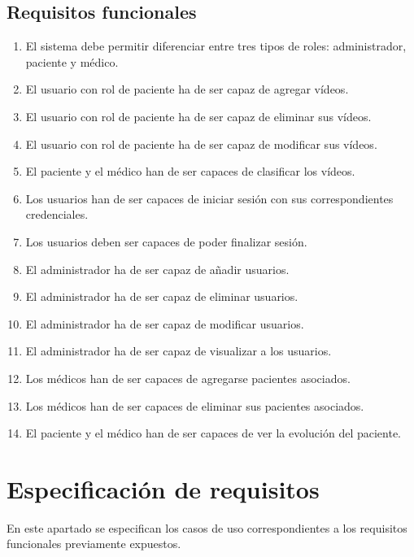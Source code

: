 \subsection{Requisitos funcionales}
\begin{enumerate}[label=\textbf{RF\arabic*:}]

\item El sistema debe permitir diferenciar entre tres tipos de roles: administrador, paciente y médico.
\item El usuario con rol de paciente ha de ser capaz de agregar vídeos.
\item El usuario con rol de paciente ha de ser capaz de eliminar sus vídeos.
\item El usuario con rol de paciente ha de ser capaz de modificar sus vídeos.
\item El paciente y el médico han de ser capaces de clasificar los vídeos.
\item Los usuarios han de ser capaces de iniciar sesión con sus correspondientes credenciales.
\item Los usuarios deben ser capaces de poder finalizar sesión.
\item El administrador ha de ser capaz de añadir usuarios.
\item El administrador ha de ser capaz de eliminar usuarios.
\item El administrador ha de ser capaz de modificar usuarios.
\item El administrador ha de ser capaz de visualizar a los usuarios.
\item Los médicos han de ser capaces de agregarse pacientes asociados.
\item Los médicos han de ser capaces de eliminar sus pacientes asociados.
\item El paciente y el médico han de ser capaces de ver la evolución del paciente.


\end{enumerate}





\section{Especificación de requisitos}

En este apartado se especifican los casos de uso correspondientes  a los requisitos funcionales previamente expuestos.

